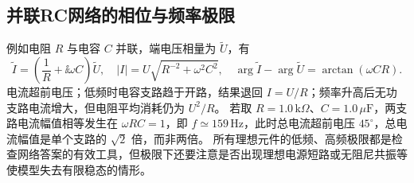\subsection{并联RC网络的相位与频率极限}
例如电阻 $R$ 与电容 $C$ 并联，端电压相量为 $\widetilde U$，有
\[
 \widetilde I=\left(\frac1R+\ii\omega C\right)\widetilde U,
 \quad |I|=U\sqrt{R^{-2}+\omega^2C^2},
 \quad \arg\widetilde I-\arg\widetilde U=\arctan(\omega CR).
\]
电流超前电压；低频时电容支路趋于开路，结果退回 $I=U/R$；频率升高后无功支路电流增大，但电阻平均消耗仍为 $U^2/R$。
若取 $R=1.0\,\mathrm{k}\Omega$、$C=1.0\,\mu\mathrm F$，两支路电流幅值相等发生在 $\omega RC=1$，即 $f\simeq159\,\mathrm{Hz}$，此时总电流超前电压 $45^\circ$，总电流幅值是单个支路的 $\sqrt2$ 倍，而非两倍。
所有理想元件的低频、高频极限都是检查网络答案的有效工具，但极限下还要注意是否出现理想电源短路或无阻尼共振等使模型失去有限稳态的情形。

